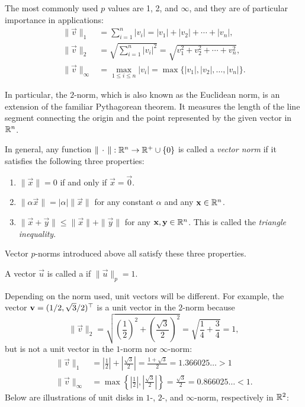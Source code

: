 \documentclass{ximera}
\begin{document}
The most commonly used $p$ values are 1, 2, and $\infty$, and they are of
particular importance in applications:
\begin{align*}
  \|\vec{v}\|_{1}
  & = \sum_{i=1}^{n} |v_i| = |v_1| + |v_2| + \cdots + |v_n|,\\
  \|\vec{v}\|_{2}
  & = \sqrt{\sum_{i=1}^{n} |v_i|^2} = \sqrt{v_1^2 + v_2^2 + \cdots + v_n^2},\\
  \|\vec{v}\|_{\infty}
  & = \max_{1\le i \le n} |v_i| = \max\{|v_1|, |v_2|, \ldots , |v_n|\}.
\end{align*}

In particular, the $2$-norm, which is also known as the Euclidean
norm, is an extension of the familiar Pythagorean theorem. It measures
the length of the line segment connecting the origin and the point
represented by the given vector in $\mathbb{R}^n$.

\begin{concept}
  In general, any function $\|\, \cdot \,\|:\mathbb{R}^n \to \mathbb{R}^{+} \cup \{0\}$ is called a
  \textit{vector norm} if it satisfies the following three properties:

  \begin{enumerate}
  \item $\|\vec{x}\| = 0$ if and only if $\vec{x} = \vec{0}$.
  \item $\|\alpha \vec{x}\| = |\alpha| \|\vec{x}\|$ for any
    constant $\alpha$ and any $\mathbf{x} \in \mathbb{R}^n$.
  \item
    $\|\vec{x} + \vec{y}\| \le \|\vec{x}\| +
    \|\vec{y}\|$ for any $\mathbf{x}, \mathbf{y} \in \mathbb{R}^n$. This
    is called the \textit{triangle inequality}.
  \end{enumerate}
  Vector $p$-norms introduced above all satisfy these three
  properties.
\end{concept}

\begin{definition}
  A vector $\vec{u}$ is called a 
  if $\|\vec{u}\|_p = 1$.
\end{definition}
Depending on the norm used, unit vectors will be different. For
example, the vector $\mathbf{v} = (1/2, \sqrt{3}/2)^\top$ is a unit
vector in the $2$-norm because
\[
  \|\vec{v}\|_2
  = \sqrt{\left( \frac{1}{2} \right)^2 + \left( \frac{\sqrt{3}}{2}
    \right)^2}
  = \sqrt{\frac{1}{4} + \frac{3}{4}} = 1,
\]
but is not a unit vector in the $1$-norm nor $\infty$-norm:
\begin{align*}
  \|\vec{v}\|_1
  & = \left| \frac{1}{2} \right| + \left| \frac{\sqrt{3}}{2} \right|
    = \frac{1 + \sqrt{3}}{2} = 1.366025\ldots > 1 \\
  \|\vec{v}\|_\infty
  & = \max\left\{ \left| \frac{1}{2} \right|, \left|
    \frac{\sqrt{3}}{2} \right|\right\}
     = \frac{\sqrt{3}}{2} = 0.866025\ldots < 1.
\end{align*}
Below are illustrations of unit disks in $1$-, $2$-, and
$\infty$-norm, respectively in $\mathbb{R}^2$:
\end{document}

